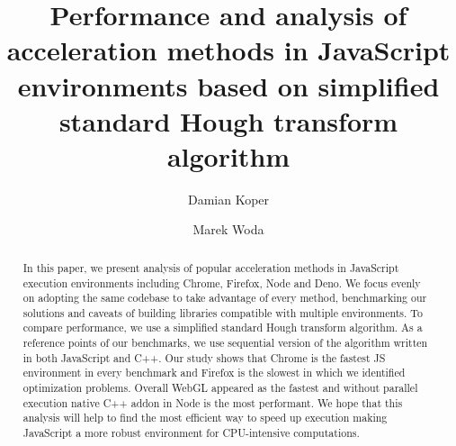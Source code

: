 \documentclass[runningheads]{llncs}
\begin{document}
%
\title{Performance and analysis of acceleration methods in JavaScript environments based on simplified standard Hough transform algorithm}
%

\author{Damian Koper \and Marek Woda}
%
%
%
\maketitle              %
%
\begin{abstract}
  In this paper, we present analysis of popular acceleration methods in JavaScript execution environments including Chrome, Firefox, Node and Deno.  We focus evenly on adopting the same codebase to take advantage of every method, benchmarking our solutions and caveats of building libraries compatible with multiple environments. To compare performance, we use a simplified standard Hough transform algorithm. As a reference points of our benchmarks, we use sequential version of the algorithm written in both JavaScript and C++. Our study shows that Chrome is the fastest JS environment in every benchmark and Firefox is the slowest in which we identified optimization problems.  Overall WebGL appeared as the fastest and without parallel execution native C++ addon in Node is the most performant. We hope that this analysis will help to find the most efficient way to speed up execution making JavaScript a more robust environment for CPU-intensive computations.

\end{abstract}






\clearpage
 


\end{document}
